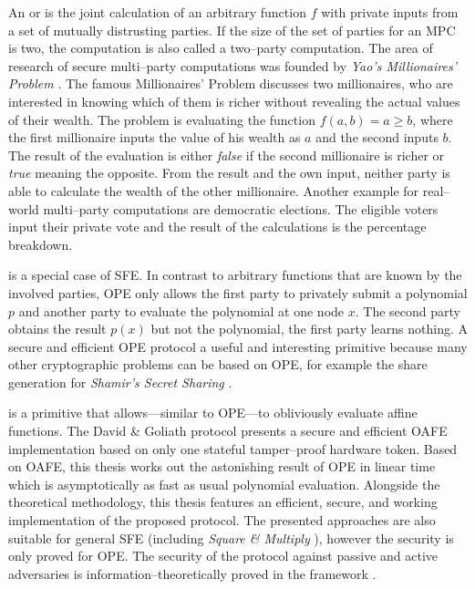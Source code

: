 \label{sec:introduction}

An  or  is the joint calculation of an arbitrary function $f$ with
private inputs from a set of mutually distrusting parties. If the size of the
set of parties for an MPC is two, the computation is also called a two--party
computation. The area of research of secure multi--party computations was
founded by \emph{Yao's Millionaires' Problem} \cite{yao82}. The famous
Millionaires' Problem discusses two millionaires, who are interested in knowing
which of them is richer without revealing the actual values of their wealth. The
problem is evaluating the function $f(a, b) = a \geq b$, where the first
millionaire inputs the value of his wealth as $a$ and the second inputs $b$. The
result of the evaluation is either \textit{false} if the second millionaire is
richer or \textit{true} meaning the opposite. From the result and the own input,
neither party is able to calculate the wealth of the other millionaire. Another
example for real--world multi--party computations are democratic elections. The
eligible voters input their private vote and the result of the calculations is
the percentage breakdown.

 \cite{naor99,naor06} is a special
case of SFE. In contrast to arbitrary functions that are known by the involved
parties, OPE only allows the first party to privately submit a polynomial $p$
and another party to evaluate the polynomial at one node $x$. The second party
obtains the result $p(x)$ but not the polynomial, the first party learns
nothing. A secure and efficient OPE protocol a useful and interesting primitive
because many other cryptographic problems can be based on OPE, for example the
share generation for \emph{Shamir's Secret Sharing} \cite{shamir79}.

 \cite{davidgoliath} is a
primitive that allows---similar to OPE---to obliviously evaluate affine
functions. The David \& Goliath protocol \cite{davidgoliath} presents a secure
and efficient OAFE implementation based on only one stateful tamper--proof
hardware token. Based on OAFE, this thesis works out the astonishing result of
OPE in linear time which is asymptotically as fast as usual polynomial
evaluation. Alongside the theoretical methodology, this thesis features an
efficient, secure, and working implementation of the proposed protocol. The
presented approaches are also suitable for general SFE (including \emph{Square
\& Multiply} \cite{knuth81}), however the security is only proved for OPE. The
security of the protocol against passive and active adversaries is
in\-for\-ma\-tion--the\-o\-ret\-ically proved in the  framework \cite{canetti05}. 


